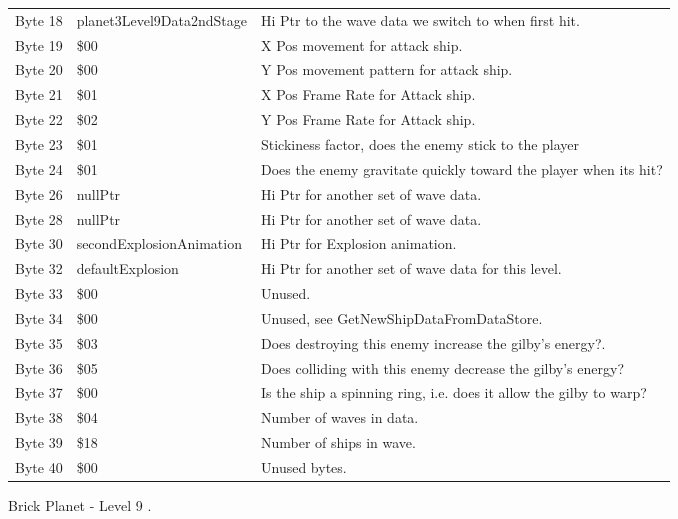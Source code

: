 \begin{figure}[H]
{\begin{adjustbox}{width=12cm}
\begin{tabular}{lll}
 Byte 18 & planet3Level9Data2ndStage & Hi Ptr to the wave data we switch to when first hit.               \\
 Byte 19 & \$00                       & X Pos movement for attack ship.                                    \\
 Byte 20 & \$00                       & Y Pos movement pattern for attack ship.                            \\
 Byte 21 & \$01                       & X Pos Frame Rate for Attack ship.                                  \\
 Byte 22 & \$02                       & Y Pos Frame Rate for Attack ship.                                  \\
 Byte 23 & \$01                       & Stickiness factor, does the enemy stick to the player              \\
 Byte 24 & \$01                       & Does the enemy gravitate quickly toward the player when its hit?   \\
 Byte 26 & nullPtr                   & Hi Ptr for another set of wave data.                               \\
 Byte 28 & nullPtr                   & Hi Ptr for another set of wave data.                               \\
 Byte 30 & secondExplosionAnimation  & Hi Ptr for Explosion animation.                                    \\
 Byte 32 & defaultExplosion          & Hi Ptr for another set of wave data for this level.                \\
 Byte 33 & \$00                       & Unused.                                                            \\
 Byte 34 & \$00                       & Unused, see GetNewShipDataFromDataStore.                           \\
 Byte 35 & \$03                       & Does destroying this enemy increase the gilby's energy?.           \\
 Byte 36 & \$05                       & Does colliding with this enemy decrease the gilby's energy?        \\
 Byte 37 & \$00                       & Is the ship a spinning ring, i.e. does it allow the gilby to warp? \\
 Byte 38 & \$04                       & Number of waves in data.                                           \\
 Byte 39 & \$18                       & Number of ships in wave.                                           \\
 Byte 40 & \$00                       & Unused bytes.                                                      \\
\bottomrule
\end{tabular}

  \end{adjustbox}

  }\caption*{Brick Planet - Level 9
.}
\end{figure}

